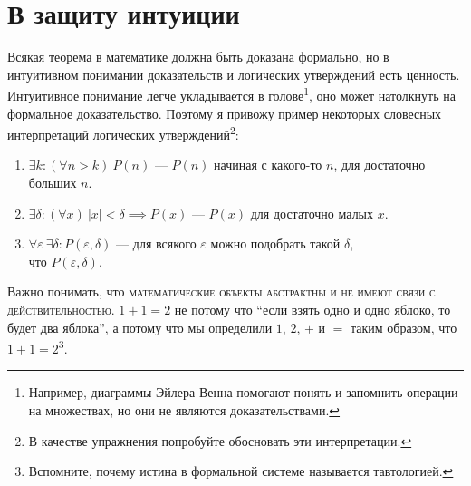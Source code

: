 \part{В защиту интуиции}

Всякая теорема в математике должна быть доказана формально,
но в интуитивном понимании доказательств и логических утверждений есть ценность.
Интуитивное понимание легче укладывается в голове\footnote{Например, диаграммы
	Эйлера-Венна помогают понять и запомнить операции на множествах, но они
	не являются доказательствами.},
оно может натолкнуть на формальное доказательство. Поэтому я привожу пример
некоторых словесных интерпретаций логических утверждений\footnote{В качестве
	упражнения попробуйте обосновать эти интерпретации.}:
\begin{enumerate}
	\item{}$\exists k:(\forall n>k)~P(n)$ --- $P(n)$ начиная с какого-то $n$,
	для достаточно больших $n$.
	\item{}$\exists \delta:(\forall x)~|x|<\delta\implies P(x)$ --- $P(x)$ для
	достаточно малых $x$.
	\item{}$\forall \varepsilon~\exists \delta:P(\varepsilon,\delta)$ ---
	для всякого $\varepsilon$ можно подобрать такой $\delta$,\\что $P(\varepsilon,\delta)$.
\end{enumerate}

Важно понимать, что \textsc{математические объекты абстрактны
	и не имеют связи с действительностью.}
${1+1=2}$ не потому что ``если взять одно и одно яблоко, то будет два яблока'', а
потому что мы определили $1$, $2$, $+$ и $=$ таким образом, что $1+1=2$\footnote{
	Вспомните, почему истина в формальной системе называется тавтологией.
}.
